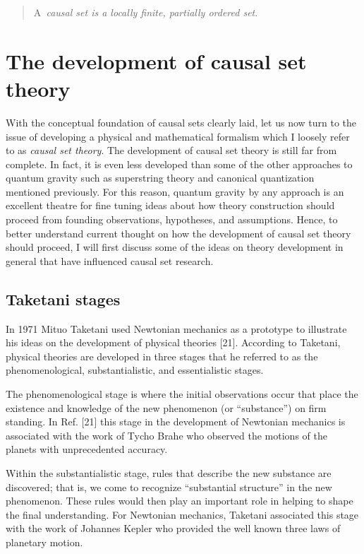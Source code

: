 \begin{quote}
A{\it \ causal set is a locally finite, partially ordered set}.
\end{quote}

\section{The development of causal set theory}

With the conceptual foundation of causal sets clearly laid, let us now turn
to the issue of developing a physical and mathematical formalism which I
loosely refer to as {\it causal set theory}. The development of causal set
theory is still far from complete. In fact, it is even less developed than
some of the other approaches to quantum gravity such as superstring theory
and canonical quantization mentioned previously. For this reason, quantum
gravity by any approach is an excellent theatre for fine tuning ideas about
how theory construction should proceed from founding observations,
hypotheses, and assumptions. Hence, to better understand current thought on
how the development of causal set theory should proceed, I will first
discuss some of the ideas on theory development in general that have
influenced causal set research.

\subsection{Taketani stages}

In 1971 Mituo Taketani used Newtonian mechanics as a prototype to illustrate
his ideas on the development of physical theories [21]. According to
Taketani, physical theories are developed in three stages that he referred
to as the phenomenological, substantialistic, and essentialistic stages.

The phenomenological stage is where the initial observations occur that
place the existence and knowledge of the new phenomenon (or ``substance'')
on firm standing. In Ref. [21] this stage in the development of Newtonian
mechanics is associated with the work of Tycho Brahe who observed the
motions of the planets with unprecedented accuracy.

Within the substantialistic stage, rules that describe the new substance are
discovered; that is, we come to recognize ``substantial structure'' in the
new phenomenon. These rules would then play an important role in helping to
shape the final understanding. For Newtonian mechanics, Taketani associated
this stage with the work of Johannes Kepler who provided the well known
three laws of planetary motion.

